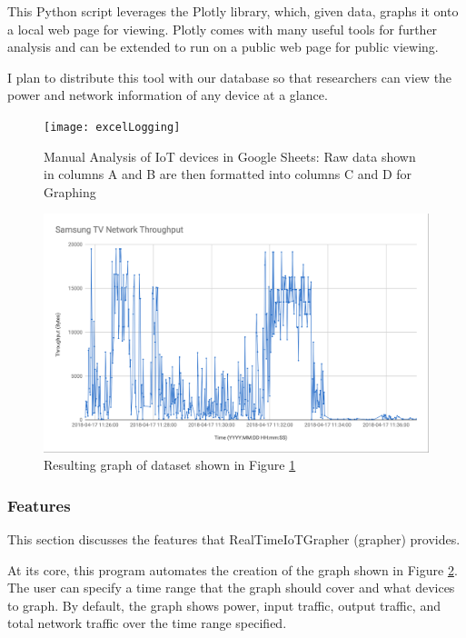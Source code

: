 This Python script leverages the Plotly \cite{plotly} library, which, given data, graphs it onto a local web page for viewing. Plotly comes with many useful tools for further analysis and can be extended to run on a public web page for public viewing.

I plan to distribute this tool with our database so that researchers can view the power and network information of any device at a glance.

\begin{figure}[H]
    \centering
    \texttt{[image: excelLogging]}
    \caption{Manual Analysis of IoT devices in Google Sheets: Raw data shown in columns A and B are then formatted into columns C and D for Graphing}
    \label{fig:excelLogging}
\end{figure}

\begin{figure}[H]
    \centering
    \includegraphics[width=1\textwidth]{figures/tvThroughput.png}
    \caption{Resulting graph of dataset shown in Figure \ref{fig:excelLogging}}
    \label{fig:tvThroughput}
\end{figure}

\subsubsection{Features}
\label{Features}

This section discusses the features that RealTimeIoTGrapher (grapher) provides.

At its core, this program automates the creation of the graph shown in Figure \ref{fig:tvThroughput}. The user can specify a time range that the graph should cover and what devices to graph. By default, the graph shows power, input traffic, output traffic, and total network traffic over the time range specified.

